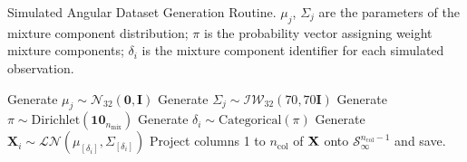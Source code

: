 \begin{algorithm}[ht]  %
        \caption{Simulated Angular Dataset Generation Routine\label{algo:simulated}.
        $\mu_j$, $\Sigma_j$ are the parameters of the mixture component distribution; 
        $\pi$ is the probability vector assigning weight mixture components; $\delta_i$ 
        is the mixture component identifier for each simulated observation.}
        \begin{algorithmic}
                \State Generate $\mu_{j} \sim \mathcal{N}_{32}\left(\bm{0},\bm{I}\right)$
                \State Generate $\Sigma_{j}\sim\mathcal{IW}_{32}\left(70,70 \bm{I}\right)$
            \EndFor
            \State Generate $\pi\sim\text{Dirichlet}(\bm{10}_{n_{\text{mix}}})$
                \State Generate $\delta_i \sim \text{Categorical}(\pi)$
                \State Generate $\bm{X}_i \sim \mathcal{LN}\left(\mu_{[\delta_i]},\Sigma_{[\delta_i]}\right)$
            \EndFor
                \State Project columns 1 to $n_{\text{col}}$ of ${\bf X}$ onto $\mathcal{S}_{\infty}^{n_{\text{col}} - 1}$ and save.
            \EndFor
        \EndFor
        \EndFor
        \end{algorithmic}
    \end{algorithm}

